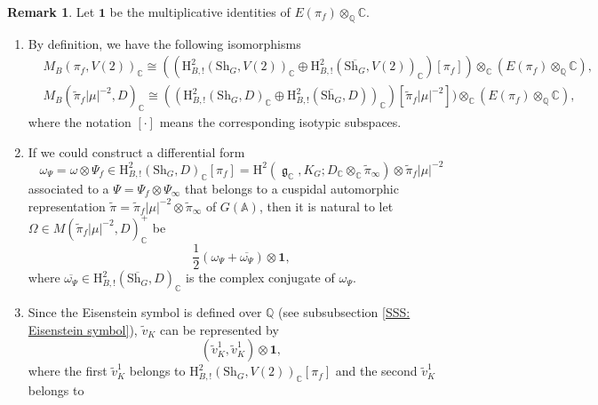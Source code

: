 \documentclass[11pt, a4paper]{amsart}
\theoremstyle{plain}
\theoremstyle{definition}
\newtheorem{remark}[theorem]{Remark}
\numberwithin{equation}{section}
\def\AAA{\mathbb{A}}
\def\CC{\mathbb{C}}
\def\QQ{\mathbb{Q}}
\DeclareMathOperator{\lieg}{\mathfrak g}
\newcommand{\Sh}{\mathrm{Sh}}
\begin{document}
\begin{remark}
\label{remark: pairing}
    Let $\mathbf{1}$ be the multiplicative identities of $E(\pi_f) \otimes_{\QQ} \CC$. 
    \begin{enumerate}
        \item By definition, we have the following isomorphisms 
              \begin{align*}
                  & M_{B}(\pi_f, V(2))_{\CC} \cong ((\mathrm{H}^{2}_{B, !}(\Sh_{G}, V(2))_{\CC} \oplus  \mathrm{H}^{2}_{B, !}(\overline{\Sh_{G}}, V(2))_{\CC})[\pi_f]) \otimes_{\CC} (E(\pi_f) \otimes_{\QQ} \CC), \\
                  & M_B(\tilde{\pi}_f|\mu|^{-2}, D)_{\CC} \cong ((\mathrm{H}^{2}_{B, !}(\Sh_{G}, D)_{\CC} \oplus \mathrm{H}^{2}_{B, !}(\overline{\Sh_{G}}, D))_{\CC})[\tilde{\pi}_f|\mu|^{-2}]) \otimes_{\CC} (E(\pi_f) \otimes_{\QQ} \CC),
              \end{align*}
              where the notation $[\cdot]$ means the corresponding isotypic subspaces. 
        \item If we could construct a differential form 
        \begin{equation*}
            \omega_{\Psi} = \omega \otimes \Psi_f \in \mathrm{H}^{2}_{B, !}(\Sh_{G}, D)_{\CC}[\pi_f] = \mathrm{H}^{2}(\lieg_{\CC}, K_{G}; D_{\CC} \otimes_{\CC} \tilde{\pi}_{\infty})\otimes \tilde{\pi}_f|\mu|^{-2}
        \end{equation*}
        associated to a $\Psi = \Psi_{f} \otimes \Psi_{\infty}$
        that belongs to a cuspidal automorphic representation $\tilde{\pi} = \tilde{\pi}_{f}|\mu|^{-2} \otimes \tilde{\pi}_{\infty}$ of $G(\AAA)$, then it is natural to let $\Omega \in M(\tilde{\pi}_f|\mu|^{-2}, D)_{\CC}^{+}$ be 
        \begin{equation*}
            \frac{1}{2} (\omega_{\Psi} + \overline{\omega_{\Psi}}) \otimes \mathbf{1}, 
        \end{equation*}
        where $\overline{\omega_{\Psi}} \in \mathrm{H}^{2}_{B, !}(\overline{\Sh_{G}}, D)_{\CC}$ is the complex conjugate of $\omega_{\Psi}$. 
        \item Since the Eisenstein symbol is defined over $\QQ$ (see subsubsection \ref{SSS: Eisenstein symbol}),  
              $\tilde{v}_{K}$ can be represented by 
              \begin{equation*}
                (\tilde{v}_{K}^{1}, \tilde{v}_{K}^{1}) \otimes \mathbf{1}, 
              \end{equation*}
              where the first $\tilde{v}_{K}^{1}$ belongs to $\mathrm{H}^{2}_{B, !}(\Sh_{G}, V(2))_{\CC}[\pi_f]$ and the second $\tilde{v}_{K}^{1}$ belongs to 

\end{enumerate}
\end{remark}
\end{document}
